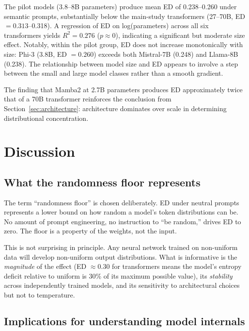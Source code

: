 \documentclass{article}
\begin{document}
The pilot models (3.8--8B parameters) produce mean ED of 0.238--0.260 under semantic prompts, substantially below the main-study transformers (27--70B, ED $= 0.313$--0.318). A regression of ED on log(parameters) across all six transformers yields $R^2 = 0.276$ ($p \approx 0$), indicating a significant but moderate size effect. Notably, within the pilot group, ED does not increase monotonically with size: Phi-3 (3.8B, ED $= 0.260$) exceeds both Mistral-7B (0.248) and Llama-8B (0.238). The relationship between model size and ED appears to involve a step between the small and large model classes rather than a smooth gradient.

The finding that Mamba2 at 2.7B parameters produces ED approximately twice that of a 70B transformer reinforces the conclusion from Section~\ref{sec:architecture}: architecture dominates over scale in determining distributional concentration.

\section{Discussion}
\label{sec:discussion}

\subsection{What the randomness floor represents}

The term ``randomness floor'' is chosen deliberately. ED under neutral prompts represents a lower bound on how random a model's token distributions can be. No amount of prompt engineering, no instruction to ``be random,'' drives ED to zero. The floor is a property of the weights, not the input.

This is not surprising in principle. Any neural network trained on non-uniform data will develop non-uniform output distributions. What is informative is the \emph{magnitude} of the effect (ED $\approx 0.30$ for transformers means the model's entropy deficit relative to uniform is 30\% of its maximum possible value), its \emph{stability} across independently trained models, and its sensitivity to architectural choices but not to temperature.

\subsection{Implications for understanding model internals}
\end{document}
